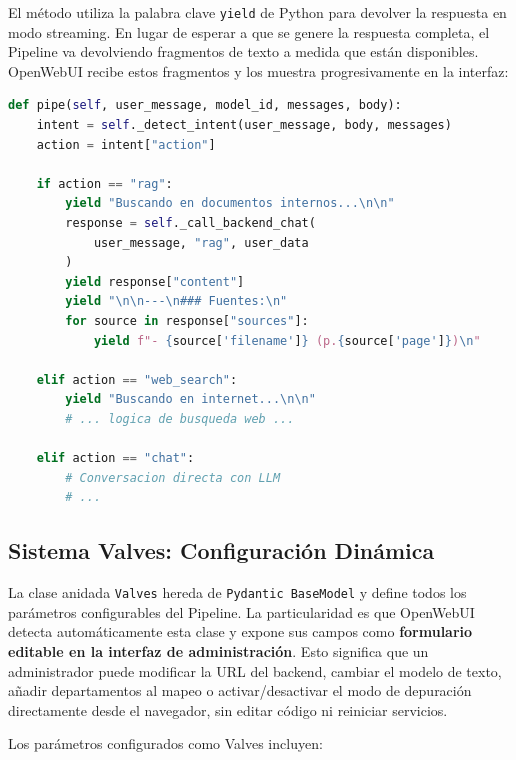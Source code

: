 El método utiliza la palabra clave \texttt{yield} de Python para devolver la respuesta en modo streaming. En lugar de esperar a que se genere la respuesta completa, el Pipeline va devolviendo fragmentos de texto a medida que están disponibles. OpenWebUI recibe estos fragmentos y los muestra progresivamente en la interfaz:

\begin{lstlisting}[language=Python, caption={Ejemplo de respuesta streaming en el Pipeline.}]
def pipe(self, user_message, model_id, messages, body):
    intent = self._detect_intent(user_message, body, messages)
    action = intent["action"]

    if action == "rag":
        yield "Buscando en documentos internos...\n\n"
        response = self._call_backend_chat(
            user_message, "rag", user_data
        )
        yield response["content"]
        yield "\n\n---\n### Fuentes:\n"
        for source in response["sources"]:
            yield f"- {source['filename']} (p.{source['page']})\n"

    elif action == "web_search":
        yield "Buscando en internet...\n\n"
        # ... logica de busqueda web ...

    elif action == "chat":
        # Conversacion directa con LLM
        # ...
\end{lstlisting}

\subsection{Sistema Valves: Configuración Dinámica}

La clase anidada \texttt{Valves} hereda de \texttt{Pydantic BaseModel} y define todos los parámetros configurables del Pipeline. La particularidad es que OpenWebUI detecta automáticamente esta clase y expone sus campos como \textbf{formulario editable en la interfaz de administración}. Esto significa que un administrador puede modificar la URL del backend, cambiar el modelo de texto, añadir departamentos al mapeo o activar/desactivar el modo de depuración directamente desde el navegador, sin editar código ni reiniciar servicios.

Los parámetros configurados como Valves incluyen:

